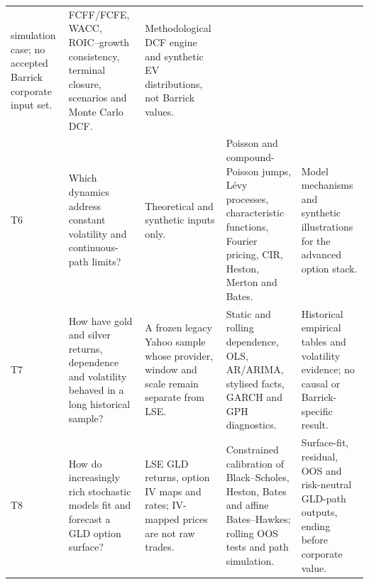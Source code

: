 \begin{table}[H]
\begin{tabularx}{\textwidth}{@{}p{0.85cm}p{2.32cm}X X X@{}}
simulation case; no accepted Barrick corporate input set. & FCFF/FCFE, WACC,
ROIC--growth consistency, terminal closure, scenarios and Monte Carlo DCF. &
Methodological DCF engine and synthetic EV distributions, not Barrick values. \\
T6 & Which dynamics address constant volatility and continuous-path limits?
& Theoretical and synthetic inputs only. & Poisson and compound-Poisson jumps,
L\'evy processes, characteristic functions, Fourier pricing, CIR, Heston,
Merton and Bates. & Model mechanisms and synthetic illustrations for the
advanced option stack. \\
T7 & How have gold and silver returns, dependence and volatility behaved in a
long historical sample? & A frozen legacy Yahoo sample whose provider, window
and scale remain separate from LSE. & Static and rolling dependence, OLS,
AR/ARIMA, stylised facts, GARCH and GPH diagnostics. & Historical empirical
tables and volatility evidence; no causal or Barrick-specific result. \\
T8 & How do increasingly rich stochastic models fit and forecast a GLD option
surface? & LSE GLD returns, option IV maps and rates; IV-mapped prices are not
raw trades. & Constrained calibration of Black--Scholes, Heston, Bates and
affine Bates--Hawkes; rolling OOS tests and path simulation. & Surface-fit,
residual, OOS and risk-neutral GLD-path outputs, ending before corporate value. \\
\bottomrule
\end{tabularx}
\end{table}

